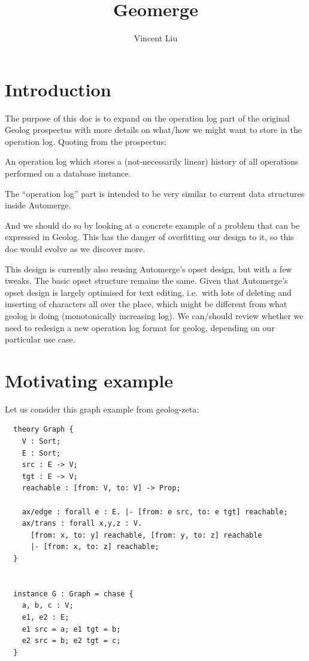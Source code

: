 \documentclass[12pt,a4paper,twoside]{article}
\title{Geomerge}
\author{Vincent Liu}
\begin{document}
\maketitle

\section{Introduction}

The purpose of this doc is to expand on the operation log part of the original
Geolog prospectus with more details on what/how we might want to store in the
operation log. Quoting from the prospectus:

\begin{displayquote}
An operation log which stores a (not-necessarily linear) history of all operations
performed on a database instance.
\end{displayquote}

\begin{displayquote}
  The ``operation log'' part is intended to be very similar to current data structures
  inside Automerge.
\end{displayquote}

And we should do so by looking at a concrete example of a problem that can be
expressed in Geolog. This has the danger of overfitting our design to it, so
this doc would evolve as we discover more. 

This design is currently also reusing Automerge's opset design, but with a few
tweaks. The basic opset structure remains the same. Given that Automerge's opset
design is largely optimised for text editing, i.e.\ with lots of deleting and inserting
of characters all over the place, which might be different from what geolog is
doing (monotonically increasing log). We can/should review whether
we need to redesign a new operation log format for geolog, depending on our particular
use case. 

\section{Motivating example}

Let us consider this graph example from geolog-zeta:

\begin{verbatim}
  theory Graph {
    V : Sort;
    E : Sort;
    src : E -> V;
    tgt : E -> V;
    reachable : [from: V, to: V] -> Prop;
  
    ax/edge : forall e : E. |- [from: e src, to: e tgt] reachable;
    ax/trans : forall x,y,z : V.
      [from: x, to: y] reachable, [from: y, to: z] reachable
      |- [from: x, to: z] reachable;
  }
  
  
  instance G : Graph = chase {
    a, b, c : V;
    e1, e2 : E;
    e1 src = a; e1 tgt = b;
    e2 src = b; e2 tgt = c;
  } 
\end{verbatim}
\end{document}
